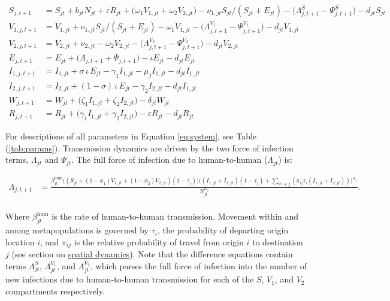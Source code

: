 \documentclass[
]{book}
\begin{document}
\begin{equation}
\begin{aligned}
S_{j,t+1} &= S_{jt} + b_{jt} N_{jt} + \varepsilon R_{jt} + \big( \omega_1 V_{1,jt} + \omega_2 V_{2,jt} \big) - \nu_{1,jt}S_{jt}/(S_{jt} + E_{jt}) - \big( \Lambda^{S}_{j,t+1} - \Psi^S_{j,t+1} \big) - d_{jt} S_{jt}\\[11pt]
V_{1,j,t+1} &= V_{1,jt} + \nu_{1,jt}S_{jt}/(S_{jt} + E_{jt}) - \omega_1 V_{1,jt} - \big( \Lambda^{V_1}_{j,t+1} - \Psi^{V_1}_{j,t+1} \big) - d_{jt} V_{1,jt}\\[11pt]
V_{2,j,t+1} &= V_{2,jt} + \nu_{2,jt} - \omega_2 V_{2,jt} - \big( \Lambda^{V_2}_{j,t+1} - \Psi^{V_2}_{j,t+1} \big) - d_{jt} V_{2,jt}\\[11pt]
E_{j,t+1} &= E_{jt} + \big( \Lambda_{j,t+1} + \Psi_{j,t+1}\big) - \iota E_{jt} - d_{jt} E_{jt}\\[11pt]
I_{1,j,t+1} &= I_{1,jt} + \sigma\,\iota\,E_{jt} - \gamma_1 I_{1,jt} - \mu_j I_{1,jt} - d_{jt} I_{1,jt}\\[11pt]
I_{2,j,t+1} &= I_{2,jt} + (1-\sigma)\,\iota\,E_{jt} - \gamma_2 I_{2,jt} - d_{jt} I_{1,jt}\\[11pt]
W_{j,t+1} &= W_{jt} + \big( \zeta_1 I_{1,jt} + \zeta_2 I_{2,jt} \big) - \delta_{jt} W_{jt}\\[11pt]
R_{j,t+1} &= R_{jt} + \big( \gamma_1 I_{1,jt} + \gamma_2 I_{2,jt} \big) - \varepsilon R_{jt} - d_{jt} R_{jt}
\end{aligned}
\label{eq:system}
\end{equation}

For descriptions of all parameters in Equation \eqref{eq:system}, see Table (\ref{tab:params}). Transmission dynamics are driven by the two force of infection terms, \(\Lambda_{jt}\) and \(\Psi_{jt}\). The full force of infection due to human-to-human (\(\Lambda_{jt}\)) is:

\begin{equation}
\begin{aligned}
\Lambda_{j,t+1} &= \frac{
\beta_{jt}^{\text{hum}} \big( (S_{jt} + (1-\phi_1) V_{1,jt} + (1-\phi_2) V_{2,jt}) (1-\tau_{j})\big)  \big((I_{1,jt} + I_{2,jt})(1-\tau_{j}) + \sum_{\forall i \not= j} (\pi_{ij}\tau_i(I_{1,jt} + I_{2,jt})) \big)^{\alpha_1}}{N_{jt}^{\alpha_2}}.\\[11pt]
\end{aligned}
\label{eq:foi-human}
\end{equation}

Where \(\beta_{jt}^{\text{hum}}\) is the rate of human-to-human transmission. Movement within and among metapopulations is governed by \(\tau_i\), the probability of departing origin location \(i\), and \(\pi_{ij}\) is the relative probability of travel from origin \(i\) to destination \(j\) (see section on \hyperref[spatial-dynamics]{spatial dynamics}). Note that the difference equations contain terms \(\Lambda^{S}_{jt}\), \(\Lambda^{V_1}_{jt}\), and \(\Lambda^{V_2}_{jt}\), which parses the full force of infection into the number of new infections due to human-to-human transmission for each of the \(S\), \(V_1\), and \(V_2\) compartments respectively.
\end{document}

